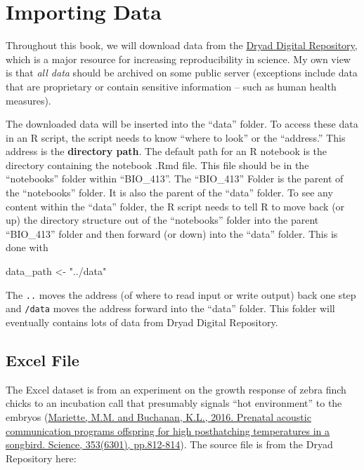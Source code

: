 \documentclass[]{book}
\newenvironment{Shaded}{\begin{snugshade}}{\end{snugshade}}
\newcommand{\StringTok}[1]{\textcolor[rgb]{0.31,0.60,0.02}{#1}}
\newcommand{\NormalTok}[1]{#1}
\theoremstyle{definition}
\theoremstyle{definition}
\theoremstyle{definition}
\theoremstyle{remark}
\begin{document}
\section{Importing Data}\label{importing-data}

Throughout this book, we will download data from the
\href{https://datadryad.org}{Dryad Digital Repository}, which is a major
resource for increasing reproducibility in science. My own view is that
\emph{all data} should be archived on some public server (exceptions
include data that are proprietary or contain sensitive information --
such as human health measures).

The downloaded data will be inserted into the ``data'' folder. To access
these data in an R script, the script needs to know ``where to look'' or
the ``address.'' This address is the \textbf{directory path}. The
default path for an R notebook is the directory containing the notebook
.Rmd file. This file should be in the ``notebooks'' folder within
``BIO\_413''. The ``BIO\_413'' Folder is the parent of the ``notebooks''
folder. It is also the parent of the ``data'' folder. To see any content
within the ``data'' folder, the R script needs to tell R to move back
(or up) the directory structure out of the ``notebooks'' folder into the
parent ``BIO\_413'' folder and then forward (or down) into the ``data''
folder. This is done with

\begin{Shaded}
\begin{Highlighting}[]
\NormalTok{data_path <-}\StringTok{ "../data"}
\end{Highlighting}
\end{Shaded}

The \texttt{..} moves the address (of where to read input or write
output) back one step and \texttt{/data} moves the address forward into
the ``data'' folder. This folder will eventually contains lots of data
from Dryad Digital Repository.

\subsection{Excel File}\label{excel-file}

The Excel dataset is from an experiment on the growth response of zebra
finch chicks to an incubation call that presumably signals ``hot
environment'' to the embryos
(\href{http://science.sciencemag.org/content/353/6301/812}{Mariette,
M.M. and Buchanan, K.L., 2016. Prenatal acoustic communication programs
offspring for high posthatching temperatures in a songbird. Science,
353(6301), pp.812-814}). The source file is from the Dryad Repository
here:
\end{document}
